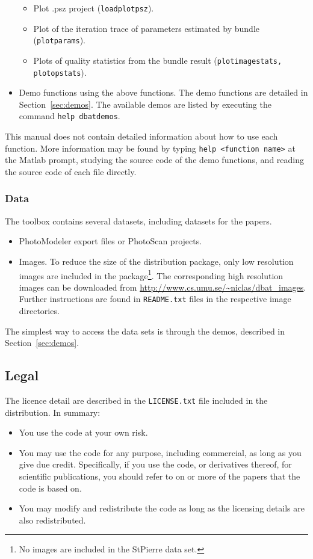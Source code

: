 \documentclass{article}
\begin{document}
\begin{itemize}
\begin{itemize}
  \item Plot .psz project (\texttt{loadplotpsz}).
  \item Plot of the iteration trace of parameters estimated by bundle
    (\texttt{plotparams}).
  \item Plots of quality statistics from the bundle result
    (\texttt{plotimagestats, plotopstats}).
  \end{itemize}
\item Demo functions using the above functions. The demo functions are
  detailed in Section~\ref{sec:demos}. The available demos are listed
  by executing the command \texttt{help dbatdemos}.
\end{itemize}

This manual does not contain detailed information about how to use
each function. More information may be found by typing \texttt{help
  <function name>} at the Matlab prompt, studying the source code of
the demo functions, and reading the source code of each file directly.

\subsubsection{Data}

The toolbox contains several datasets, including datasets for the
\citet{Borlin2016:External,Murtiyoso2017:Reprocessing} papers.
\begin{itemize}
\item PhotoModeler export files or PhotoScan projects.
\item Images. To reduce the size of the distribution package, only low
  resolution images are included in the package\footnote{No images are
    included in the StPierre data set.}. The corresponding high
  resolution images can be downloaded from
  \url{http://www.cs.umu.se/~niclas/dbat_images}. Further instructions
  are found in \texttt{README.txt} files in the respective image
  directories.
\end{itemize}
The simplest way to access the data sets is through the demos,
described in Section~\ref{sec:demos}.

\subsection{Legal}

The licence detail are described in the \texttt{LICENSE.txt} file
included in the distribution. In summary:
\begin{itemize}
\item You use the code at your own risk.
\item You may use the code for any purpose, including commercial, as
  long as you give due credit. Specifically, if you use the code, or
  derivatives thereof, for scientific publications, you should refer
  to on or more of the papers
  \citet{Borlin2013:Bundle,Borlin2013:Experiments,Borlin2014:Camera,Borlin2016:External,Borlin2018:Modular}
  that the code is based on.
\item You may modify and redistribute the code as long as the
  licensing details are also redistributed.
\end{itemize}
\end{document}
